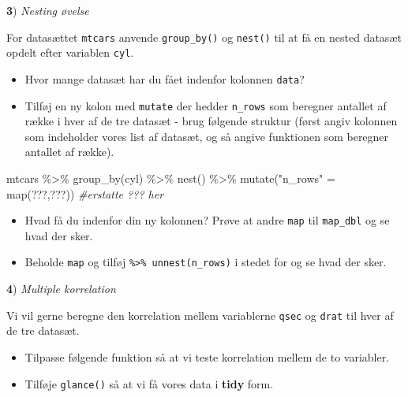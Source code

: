 \documentclass[
]{book}
\newenvironment{Shaded}{\begin{snugshade}}{\end{snugshade}}
\newcommand{\CommentTok}[1]{\textcolor[rgb]{0.56,0.35,0.01}{\textit{#1}}}
\newcommand{\ErrorTok}[1]{\textcolor[rgb]{0.64,0.00,0.00}{\textbf{#1}}}
\newcommand{\FunctionTok}[1]{\textcolor[rgb]{0.00,0.00,0.00}{#1}}
\newcommand{\NormalTok}[1]{#1}
\newcommand{\OtherTok}[1]{\textcolor[rgb]{0.56,0.35,0.01}{#1}}
\newcommand{\SpecialCharTok}[1]{\textcolor[rgb]{0.00,0.00,0.00}{#1}}
\newcommand{\StringTok}[1]{\textcolor[rgb]{0.31,0.60,0.02}{#1}}
\providecommand{\tightlist}{%
  \setlength{\itemsep}{0pt}\setlength{\parskip}{0pt}}
\begin{document}
\textbf{3}) \emph{Nesting øvelse}

For datasættet \texttt{mtcars} anvende \texttt{group\_by()} og \texttt{nest()} til at få en nested datasæt opdelt efter variablen \texttt{cyl}.

\begin{itemize}
\item
  Hvor mange datasæt har du fået indenfor kolonnen \texttt{data}?
\item
  Tilføj en ny kolon med \texttt{mutate} der hedder \texttt{n\_rows} som beregner antallet af række i hver af de tre datasæt - brug følgende struktur (først angiv kolonnen som indeholder vores list af datasæt, og så angive funktionen som beregner antallet af række).
\end{itemize}

\begin{Shaded}
\begin{Highlighting}[]
\NormalTok{mtcars }\SpecialCharTok{\%\textgreater{}\%} 
  \FunctionTok{group\_by}\NormalTok{(cyl) }\SpecialCharTok{\%\textgreater{}\%} 
  \FunctionTok{nest}\NormalTok{() }\SpecialCharTok{\%\textgreater{}\%}
  \FunctionTok{mutate}\NormalTok{(}\StringTok{"n\_rows"} \OtherTok{=} \FunctionTok{map}\NormalTok{(???,???)) }\CommentTok{\#erstatte ??? her}
\end{Highlighting}
\end{Shaded}

\begin{itemize}
\tightlist
\item
  Hvad få du indenfor din ny kolonnen? Prøve at andre \texttt{map} til \texttt{map\_dbl} og se hvad der sker.
\item
  Beholde \texttt{map} og tilføj \texttt{\%\textgreater{}\%\ unnest(n\_rows)} i stedet for og se hvad der sker.
\end{itemize}

\textbf{4}) \emph{Multiple korrelation}

Vi vil gerne beregne den korrelation mellem variablerne \texttt{qsec} og \texttt{drat} til hver af de tre datasæt.

\begin{itemize}
\tightlist
\item
  Tilpasse følgende funktion så at vi teste korrelation mellem de to variabler.
\item
  Tilføje \texttt{glance()} så at vi få vores data i \textbf{tidy} form.
\end{itemize}

\begin{Shaded}
\end{Shaded}
\end{document}
